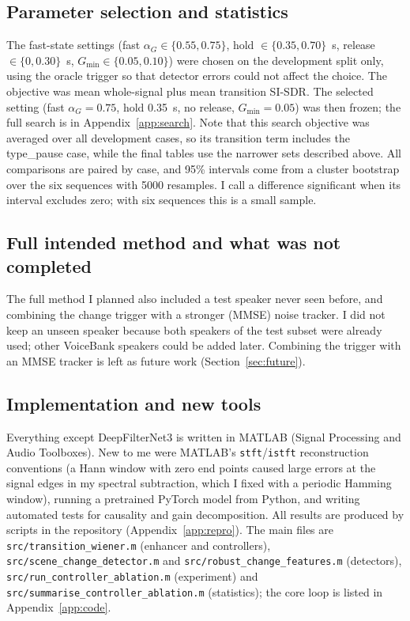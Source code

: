 \documentclass[10pt,conference,a4paper]{IEEEtran}
\begin{document}
\subsection{Parameter selection and statistics}
The fast-state settings (fast $\alpha_G\in\{0.55,0.75\}$, hold
$\in\{0.35,0.70\}$~s, release $\in\{0,0.30\}$~s, $G_{\min}\in\{0.05,0.10\}$)
were chosen on the development split only, using the oracle trigger so that
detector errors could not affect the choice. The objective was mean whole-signal
plus mean transition SI-SDR. The selected setting (fast $\alpha_G=0.75$, hold
0.35~s, no release, $G_{\min}=0.05$) was then frozen; the full search is in
Appendix~\ref{app:search}. Note that this search objective was averaged over
all development cases, so its transition term includes the type\_pause case,
while the final tables use the narrower sets described above. All comparisons
are paired by case, and 95\%
intervals come from a cluster bootstrap over the six sequences with 5000
resamples. I call a difference significant when its interval excludes zero; with
six sequences this is a small sample.

\subsection{Full intended method and what was not completed}
The full method I planned also included a test speaker never seen before, and
combining the change trigger with a stronger (MMSE) noise tracker. I did not
keep an unseen speaker because both speakers of the test subset were already
used; other VoiceBank speakers could be added later. Combining the trigger with an MMSE
tracker is left as future work (Section~\ref{sec:future}).

\subsection{Implementation and new tools}
Everything except DeepFilterNet3 is written in MATLAB (Signal Processing and
Audio Toolboxes). New to me were MATLAB's \texttt{stft}/\texttt{istft}
reconstruction conventions (a Hann window with zero end points caused large
errors at the signal edges in my spectral subtraction, which I fixed with a
periodic Hamming window), running a pretrained PyTorch model from Python, and
writing automated tests for causality and gain decomposition. All results are
produced by scripts in the repository (Appendix~\ref{app:repro}). The main files
are \texttt{src/transition\_wiener.m} (enhancer and controllers),
\texttt{src/scene\_change\_detector.m} and
\texttt{src/robust\_change\_features.m} (detectors),
\texttt{src/run\_controller\_ablation.m} (experiment) and
\texttt{src/summarise\_controller\_ablation.m} (statistics); the core loop is
listed in Appendix~\ref{app:code}.
\end{document}
